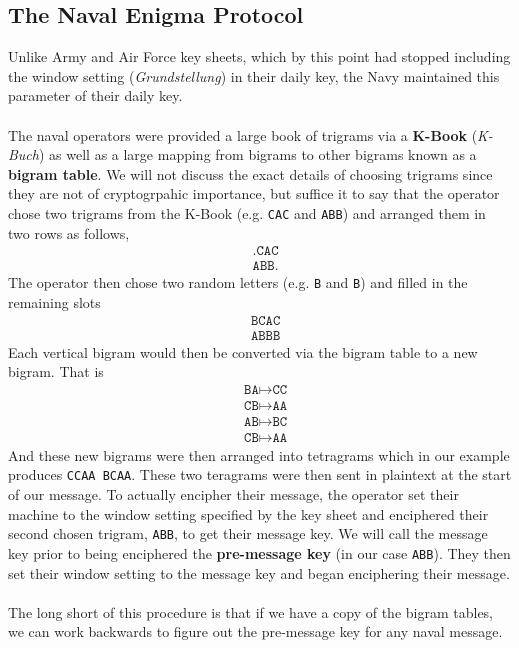 \subsection{The Naval Enigma Protocol}
Unlike Army and Air Force key sheets, which by this point had stopped
including the window setting (\emph{Grundstellung}) in their daily
key, the Navy maintained this parameter of their daily key.
\\\\The naval operators were provided a large book of trigrams via a
{\bf{{K-Book}}} (\emph{K-Buch}) as well as a large mapping from
bigrams to other bigrams known as a {\bf{bigram table}}. We will not
discuss the exact details of choosing trigrams since they are not of
cryptogrpahic importance, but suffice it to say that the operator
chose two trigrams from the K-Book (e.g. \texttt{CAC} and
\texttt{ABB}) and arranged them in two rows as follows,
\begin{align*}
  & \texttt{.CAC} \\
  & \texttt{ABB.}
\end{align*}
The operator then chose two random letters (e.g. \texttt{B} and
\texttt{B}) and filled in the remaining slots
\begin{align*}
  & \texttt{BCAC} \\
  & \texttt{ABBB}
\end{align*}
Each vertical bigram would then be converted via the bigram table to
a new bigram. That is
\begin{align*}
  & \texttt{BA} \mapsto \texttt{CC} \\
  & \texttt{CB} \mapsto \texttt{AA} \\
  & \texttt{AB} \mapsto \texttt{BC} \\
  & \texttt{CB} \mapsto \texttt{AA}
\end{align*}
And these new bigrams were then arranged into tetragrams which in our
example produces \texttt{CCAA BCAA}. These two teragrams were then
sent in plaintext at the start of our message. To actually encipher
their message, the operator set their machine to the window setting
specified by the key sheet and enciphered their second chosen trigram, \texttt{ABB}, to get their message key. We will call the message
  key prior to being enciphered the {\bf{pre-message key}} (in our
  case \texttt{ABB}). They then set their window setting to the
  message key and began enciphering their message.
  \\\\The long short of this procedure is that if we have a copy of
  the bigram tables, we can work backwards to figure out the
  pre-message key for any naval message. 
